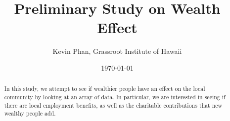 \documentclass[12pt]{article} %
\title{Preliminary Study on Wealth Effect}
\author{Kevin Phan, Grassroot Institute of Hawaii}
\date{\today}
\begin{document}
\maketitle
\begin{abstract}
    In this study, we attempt to see if wealthier people have an effect on the local community by 
    looking at an array of data. In particular, we are interested in seeing if there are local employment benefits, as well as 
    the charitable contributions that new wealthy people add.
\end{abstract}




\end{document}
